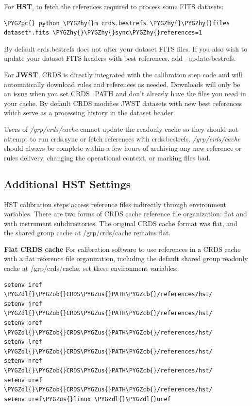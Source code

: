 \documentclass[letterpaper,10pt,english]{sphinxmanual}
\def\PYGZus{\char`\_}
\def\PYGZob{\char`\{}
\def\PYGZcb{\char`\}}
\def\PYGZpc{\char`\%}
\def\PYGZdl{\char`\$}
\def\PYGZhy{\char`\-}
\begin{document}
For \textbf{HST}, to fetch the references required to process some FITS datasets:

\begin{Verbatim}[commandchars=\\\{\}]
\PYGZpc{} python \PYGZhy{}m crds.bestrefs \PYGZhy{}\PYGZhy{}files dataset*.fits \PYGZhy{}\PYGZhy{}sync\PYGZhy{}references=1
\end{Verbatim}

By default crds.bestrefs does not alter your dataset FITS files.   If you also wish to update your dataset FITS
headers with best references,  add --update-bestrefs.

For \textbf{JWST},  CRDS is directly integrated with the calibration step code and will automatically download
rules and references as needed.   Downloads will only be an issue when you set CRDS\_PATH and don't already
have the files you need in your cache.   By default CRDS modifies JWST datasets with new best references
which serve as a processing history in the dataset header.

Users of \emph{/grp/crds/cache} cannot update the readonly cache so they should not attempt to run crds.sync or
fetch references with crds.bestrefs.  \emph{/grp/crds/cache} should always be complete within a few hours of archiving
any new reference or rules delivery,  changing the operational context,  or marking files bad.


\subsection{Additional HST Settings}
\label{installation:additional-hst-settings}
HST calibration steps access reference files indirectly through environment variables.  There are two forms
of CRDS cache reference file organization:  flat and with instrument subdirectories.   The original CRDS cache
format was flat,  and the shared group cache at /grp/crds/cache remains flat.

\textbf{Flat CRDS cache} For calibration software to use references in a CRDS cache with a flat reference file
organization, including the default shared group readonly cache at /grp/crds/cache,  set these environment
variables:

\begin{Verbatim}[commandchars=\\\{\}]
setenv iref \PYGZdl{}\PYGZob{}CRDS\PYGZus{}PATH\PYGZcb{}/references/hst/
setenv jref \PYGZdl{}\PYGZob{}CRDS\PYGZus{}PATH\PYGZcb{}/references/hst/
setenv oref \PYGZdl{}\PYGZob{}CRDS\PYGZus{}PATH\PYGZcb{}/references/hst/
setenv lref \PYGZdl{}\PYGZob{}CRDS\PYGZus{}PATH\PYGZcb{}/references/hst/
setenv nref \PYGZdl{}\PYGZob{}CRDS\PYGZus{}PATH\PYGZcb{}/references/hst/
setenv uref \PYGZdl{}\PYGZob{}CRDS\PYGZus{}PATH\PYGZcb{}/references/hst/
setenv uref\PYGZus{}linux \PYGZdl{}\PYGZdl{}uref
\end{Verbatim}
\end{document}
